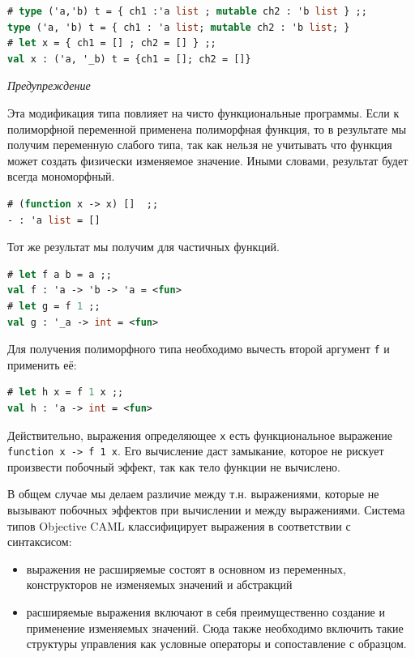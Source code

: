 \begin{lstlisting}[language=OCaml]
# type ('a,'b) t = { ch1 :'a list ; mutable ch2 : 'b list } ;;
type ('a, 'b) t = { ch1 : 'a list; mutable ch2 : 'b list; }
# let x = { ch1 = [] ; ch2 = [] } ;;
val x : ('a, '_b) t = {ch1 = []; ch2 = []}
\end{lstlisting}

{\it Предупреждение}

Эта модификация типа повлияет на чисто функциональные программы.
Если к полиморфной переменной применена полиморфная функция, то в результате мы
получим переменную слабого типа, так как нельзя не учитывать что функция может
создать физически изменяемое значение. Иными словами, результат будет всегда
мономорфный.

\begin{lstlisting}[language=OCaml]
# (function x -> x) []  ;;
- : 'a list = []
\end{lstlisting}

Тот же результат мы получим для частичных функций.

\begin{lstlisting}[language=OCaml]
# let f a b = a ;;
val f : 'a -> 'b -> 'a = <fun>
# let g = f 1 ;;
val g : '_a -> int = <fun>
\end{lstlisting}

Для получения полиморфного типа необходимо вычесть второй аргумент \texttt{f} и
применить её:

\begin{lstlisting}[language=OCaml]
# let h x = f 1 x ;;
val h : 'a -> int = <fun>
\end{lstlisting}

Действительно, выражения определяющее \texttt{x} есть функциональное выражение
\texttt{function x -> f 1 x}. Его вычисление даст замыкание, которое не рискует
произвести побочный эффект, так как тело функции не вычислено.

В общем случае мы делаем различие между т.н.  выражениями,
которые не вызывают побочных эффектов при вычислении и между 
выражениями. Система типов Objective CAML классифицирует выражения в
соответствии с синтаксисом:

\begin{itemize}
	\item выражения не расширяемые состоят в основном из переменных,
конструкторов не изменяемых значений и абстракций

	\item расширяемые выражения включают в себя преимущественно создание и
применение изменяемых значений. Сюда также необходимо включить такие структуры
управления как условные операторы и сопоставление с образцом.
\end{itemize}
